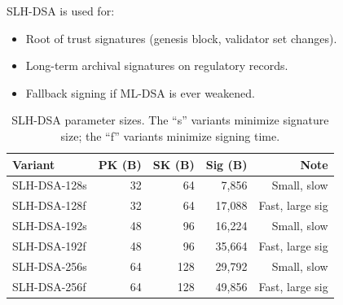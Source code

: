 SLH-DSA is used for:
\begin{itemize}[nosep]
  \item Root of trust signatures (genesis block, validator set changes).
  \item Long-term archival signatures on regulatory records.
  \item Fallback signing if ML-DSA is ever weakened.
\end{itemize}

\begin{table}[h]
\centering
\begin{tabular}{lrrrr}
\toprule
\textbf{Variant} & \textbf{PK (B)} & \textbf{SK (B)} &
\textbf{Sig (B)} & \textbf{Note} \\
\midrule
SLH-DSA-128s & 32  & 64  & 7,856  & Small, slow \\
SLH-DSA-128f & 32  & 64  & 17,088 & Fast, large sig \\
SLH-DSA-192s & 48  & 96  & 16,224 & Small, slow \\
SLH-DSA-192f & 48  & 96  & 35,664 & Fast, large sig \\
SLH-DSA-256s & 64  & 128 & 29,792 & Small, slow \\
SLH-DSA-256f & 64  & 128 & 49,856 & Fast, large sig \\
\bottomrule
\end{tabular}
\caption{SLH-DSA parameter sizes.  The ``s'' variants minimize signature
size; the ``f'' variants minimize signing time.}
\label{tab:slhdsa-sizes}
\end{table}

